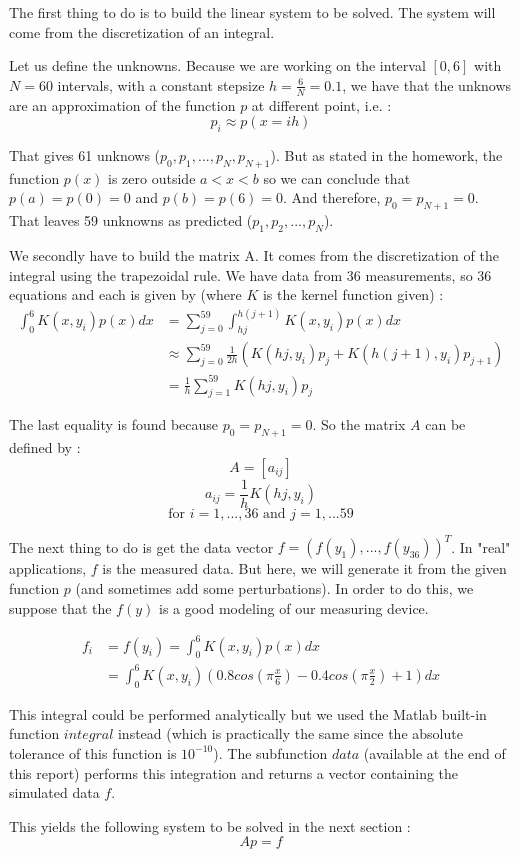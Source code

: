 The first thing to do is to build the linear system to be solved. The system will come from the discretization of an integral. 

Let us define the unknowns. Because we are working on the interval $[0,6]$ with $N=60$ intervals, with a constant stepsize $h=\frac{6}{N}=0.1$, we have that the unknows are an approximation of the function $p$ at different point, i.e. : 
$$p_i \approx p(x=ih)$$

That gives 61 unknows ($p_0,p_1,...,p_N,p_{N+1}$). But as stated in the homework, the function $p(x)$ is zero outside $a<x<b$ so we can conclude that $p(a)=p(0)=0$ and $p(b)=p(6)=0$. And therefore, $p_0=p_{N+1}=0$. That leaves 59 unknowns as predicted ($p_1,p_2,...,p_N$).

We secondly have to build the matrix A. It comes from the discretization of the integral using the trapezoidal rule. We have data from 36 measurements, so 36 equations and each is given by (where $K$ is the kernel function given) : 
\begin{align*}
\int_0^{6}K(x,y_i)p(x)dx &=\sum_{j=0}^{59} \int^{h(j+1)}_{hj} K(x,y_i)p(x)dx\\
&\approx \sum_{j=0}^{59} \frac{1}{2h}(K(hj,y_i)p_j+K(h(j+1),y_i)p_{j+1})\\
&=\frac{1}{h}\sum_{j=1}^{59} K(hj,y_i)p_j
\end{align*}

The last equality is found because $p_0=p_{N+1}=0$. So the matrix $A$ can be defined by : 
$$A=[a_{ij}]$$
$$a_{ij} = \frac{1}{h}K(hj,y_i)$$
$$\text{for }i=1,...,36 \text{ and }j=1,...59$$

The next thing to do is get the data vector $f=(f(y_1),...,f(y_{36}))^T$. In "real" applications, $f$ is the measured data. But here, we will generate it from the given function $p$ (and sometimes add some perturbations). In order to do this, we suppose that the $f(y)$ is a good modeling of our measuring device.

\begin{align*}
f_i&=f(y_i)=\int_0^{6}K(x,y_i)p(x)dx\\
&=\int_0^{6}K(x,y_i)(0.8cos(\pi\frac{x}{6})-0.4cos(\pi\frac{x}{2})+1)dx
\end{align*}

This integral could be performed analytically but we used the Matlab built-in function $integral$ instead (which is practically the same since the absolute tolerance of this function is $10^{-10}$). The subfunction $data$ (available at the end of this report) performs this integration and returns a vector containing the simulated data $f$.

This yields the following system to be solved in the next section : 
$$Ap=f$$
